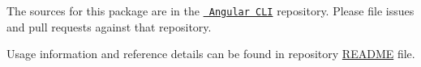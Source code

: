 The sources for this package are in the \href{https://github.com/angular/angular-cli}{\texttt{ Angular CLI}} repository. Please file issues and pull requests against that repository.

Usage information and reference details can be found in repository \mbox{\hyperlink{md__c___users_vaishnavi_jadhav__desktop__developer_code_mean_stack_example_client__r_e_a_d_m_e}{README}} file. 